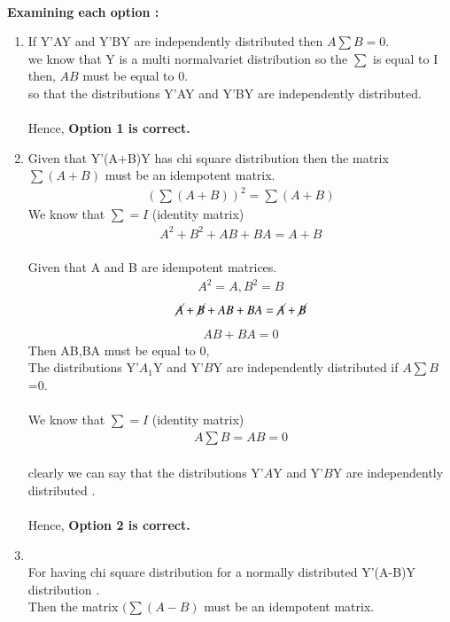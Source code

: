 \documentclass[journal,12pt,twocolumn]{IEEEtran}
\begin{document}
\\\textbf{Examining each option :} 
\begin{enumerate}
\item
If Y'AY and Y'BY are independently distributed then $A\sum B=0$.\\
we know that Y is a multi normalvariet distribution so the $\sum$ is equal to I then, $AB$ must be equal to 0.\\
so that the distributions  Y'AY and Y'BY are independently distributed.\\
\\Hence, \textbf{Option 1 is correct.}\\
\item
Given that Y'(A+B)Y has chi square distribution then the matrix $\sum(A+B)$ must be an idempotent matrix.\\
  \begin{align}
 (\textstyle \sum(A+B))^2=\sum(A+B) 
  \end{align}
   We know that $\sum=I$ (identity matrix)
    \begin{align}
  A^2+B^2+AB+BA=A+B 
  \end{align}
  \\Given that A and B are idempotent matrices.
    \begin{align}
 A^2=A ,B^2=B  
  \end{align}
   \begin{align}
 \cancel{A}+\cancel{B}+AB+BA=\cancel{A}+\cancel{B}
  \end{align}
  \begin{align}
 AB+BA=0 
  \end{align}
 Then AB,BA must be equal to 0,\\
The distributions Y'$A_1$Y and  Y'$B$Y  are independently distributed if $A\sum B$=0.\\
 \\We know that $\sum=I$ (identity matrix)
 \begin{align}
 A \textstyle \sum B=AB=0
   \end{align}
  \\ clearly we can say that the distributions Y'$A$Y and  Y'$B$Y  are independently distributed .\\
   \\Hence, \textbf{Option 2 is correct.}\\
   \item
 \\ For having chi square distribution for a normally distributed Y'(A-B)Y distribution .
 \\Then the matrix $(\sum(A-B)$  must be an idempotent matrix.\\

\end{enumerate}
\end{document}
